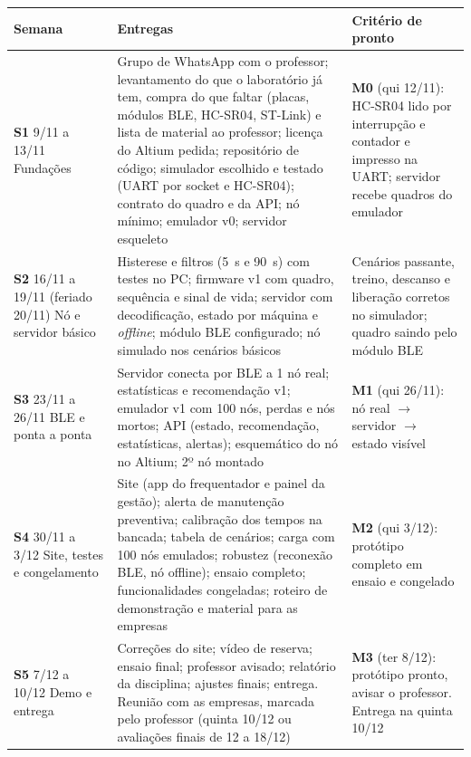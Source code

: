 \documentclass[11pt,a4paper]{article}
\begin{document}
\begin{longtable}{|L{2.5cm}|L{8.0cm}|L{4.9cm}|}
\hline
\textbf{Semana} & \textbf{Entregas} & \textbf{Critério de pronto} \\ \hline
\textbf{S1} 9/11 a 13/11 \newline Fundações &
Grupo de WhatsApp com o professor; levantamento do que o laboratório já tem, compra do que faltar (placas, módulos BLE, HC-SR04, ST-Link) e lista de material ao professor; licença do Altium pedida; repositório de código; simulador escolhido e testado (UART por socket e HC-SR04); contrato do quadro e da API; nó mínimo; emulador v0; servidor esqueleto &
\textbf{M0} (qui 12/11): HC-SR04 lido por interrupção e contador e impresso na UART; servidor recebe quadros do emulador \\ \hline
\textbf{S2} 16/11 a 19/11 (feriado 20/11) \newline Nó e servidor básico &
Histerese e filtros (5~s e 90~s) com testes no PC; firmware v1 com quadro, sequência e sinal de vida; servidor com decodificação, estado por máquina e \emph{offline}; módulo BLE configurado; nó simulado nos cenários básicos &
Cenários passante, treino, descanso e liberação corretos no simulador; quadro saindo pelo módulo BLE \\ \hline
\textbf{S3} 23/11 a 26/11 \newline BLE e ponta a ponta &
Servidor conecta por BLE a 1 nó real; estatísticas e recomendação v1; emulador v1 com 100 nós, perdas e nós mortos; API (estado, recomendação, estatísticas, alertas); esquemático do nó no Altium; 2º nó montado &
\textbf{M1} (qui 26/11): nó real $\rightarrow$ servidor $\rightarrow$ estado visível \\ \hline
\textbf{S4} 30/11 a 3/12 \newline Site, testes e congelamento &
Site (app do frequentador e painel da gestão); alerta de manutenção preventiva; calibração dos tempos na bancada; tabela de cenários; carga com 100 nós emulados; robustez (reconexão BLE, nó offline); ensaio completo; funcionalidades congeladas; roteiro de demonstração e material para as empresas &
\textbf{M2} (qui 3/12): protótipo completo em ensaio e congelado \\ \hline
\textbf{S5} 7/12 a 10/12 \newline Demo e entrega &
Correções do site; vídeo de reserva; ensaio final; professor avisado; relatório da disciplina; ajustes finais; entrega. Reunião com as empresas, marcada pelo professor (quinta 10/12 ou avaliações finais de 12 a 18/12) &
\textbf{M3} (ter 8/12): protótipo pronto, avisar o professor. Entrega na quinta 10/12 \\ \hline
\end{longtable}
\end{document}
